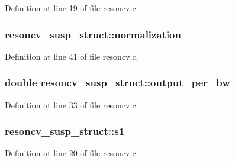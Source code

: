 Definition at line 19 of file resoncv.\+c.

\subsubsection[{\texorpdfstring{normalization}{normalization}}]{ resoncv\+\_\+susp\+\_\+struct\+::normalization}\hypertarget{structresoncv__susp__struct_afd968b4500cac87c0b4bd10e566b7c2b}{}\label{structresoncv__susp__struct_afd968b4500cac87c0b4bd10e566b7c2b}


Definition at line 41 of file resoncv.\+c.

\subsubsection[{\texorpdfstring{output\+\_\+per\+\_\+bw}{output_per_bw}}]{\setlength{\rightskip}{0pt plus 5cm}double resoncv\+\_\+susp\+\_\+struct\+::output\+\_\+per\+\_\+bw}\hypertarget{structresoncv__susp__struct_a5ef941d15ba9e7bb4ad984f10cb1f2da}{}\label{structresoncv__susp__struct_a5ef941d15ba9e7bb4ad984f10cb1f2da}


Definition at line 33 of file resoncv.\+c.

\subsubsection[{\texorpdfstring{s1}{s1}}]{ resoncv\+\_\+susp\+\_\+struct\+::s1}\hypertarget{structresoncv__susp__struct_a12e15affd09ec398744ee0b4b9c9cef4}{}\label{structresoncv__susp__struct_a12e15affd09ec398744ee0b4b9c9cef4}


Definition at line 20 of file resoncv.\+c.

